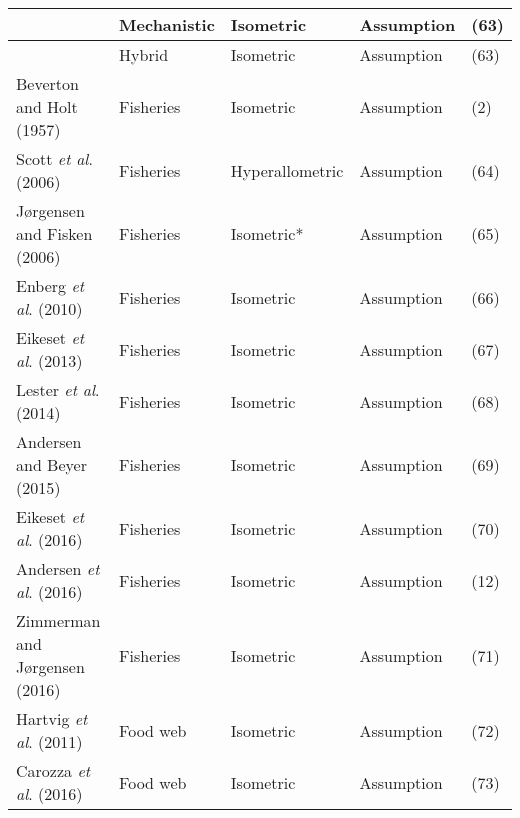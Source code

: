 \documentclass[a4paper]{article} %
\begin{document}
\begin{table}[H]
\begin{tabular}{|l|l|l|l|l|}
    \autocite{Smallegange2017}              & Mechanistic               & Isometric        & Assumption                        & (63)          \\ \hline
    \autocite{Audzijonyte2018}              & Hybrid                    & Isometric        & Assumption                        & (63)          \\ \hline
    Beverton and Holt (1957)                & Fisheries                 & Isometric        & Assumption                        & (2)           \\ \hline
    Scott \textit{et al}. (2006)            & Fisheries                 & Hyperallometric  & Assumption                        & (64)          \\ \hline
    Jørgensen and Fisken (2006)             & Fisheries                 & Isometric*       & Assumption                        & (65)          \\ \hline
    Enberg \textit{et al}. (2010)           & Fisheries                 & Isometric        & Assumption                        & (66)          \\ \hline
    Eikeset \textit{et al}. (2013)          & Fisheries                 & Isometric        & Assumption                        & (67)          \\ \hline
    Lester \textit{et al}. (2014)           & Fisheries                 & Isometric        & Assumption                        & (68)          \\ \hline
    Andersen and Beyer (2015)               & Fisheries                 & Isometric        & Assumption                        & (69)          \\ \hline
    Eikeset \textit{et al}. (2016)          & Fisheries                 & Isometric        & Assumption                        & (70)          \\ \hline
    Andersen \textit{et al}. (2016)         & Fisheries                 & Isometric        & Assumption                        & (12)          \\ \hline
    Zimmerman and Jørgensen (2016)          & Fisheries                 & Isometric        & Assumption                        & (71)          \\ \hline
    Hartvig \textit{et al}. (2011)          & Food web                  & Isometric        & Assumption                        & (72)          \\ \hline
    Carozza \textit{et al}. (2016)          & Food web                  & Isometric        & Assumption                        & (73)          \\ \hline
    \end{tabular}
\end{table}

\newpage{}

\let\mkbibnamefamily\textsc\printbibliography[title=SI Bibliography]\thispagestyle{empty} %
\end{document}
